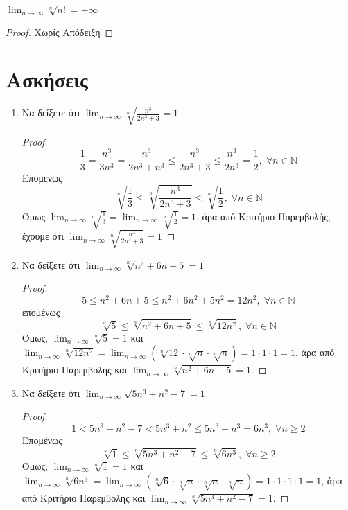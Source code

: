 \begin{mybox3}
  \begin{prop}
    $ \lim_{n \to \infty} \sqrt[n]{n!} = +\infty $ 
  \end{prop}
\end{mybox3}
\begin{proof}
  Χωρίς Απόδειξη
\end{proof}

\section{Ασκήσεις}

\begin{enumerate}
    \item Να δείξετε ότι $ \lim_{n \to \infty} \sqrt[n]{\frac{n^{3}}{2n^{3}+3}} = 1$
      \begin{proof}
        \[
          \frac{1}{3} = \frac{n^{3}}{3n^{3}} = \frac{n^{3}}{2n^{3}+n^{3}} \leq 
          \frac{n^{3}}{2n^{3}+3} \leq \frac{n^{3}}{2n^{3}} = \frac{1}{2}, \; \forall n
          \in \mathbb{N}
        \] 
        Επομένως
        \[
          \sqrt[n]{\frac{1}{3}} \leq \sqrt[n]{\frac{n^{3}}{2n^{3}+3}} \leq
          \sqrt[n]{\frac{1}{2}}, \; \forall n \in \mathbb{N} 
        \] 
        Όμως $ \lim_{n \to \infty} \sqrt[n]{\frac{1}{3}} = \lim_{n \to \infty}
        \sqrt[n]{\frac{1}{2}} = 1 $, άρα από Κριτήριο Παρεμβολής, έχουμε ότι 
        $ \lim_{n \to \infty} \sqrt[n]{\frac{n^{3}}{2n^{3}+3}} = 1 $
      \end{proof}

    \item Να δείξετε ότι $ \lim_{n \to \infty} \sqrt[n]{n^{2}+6n+5} = 1 $
      \begin{proof}
        \[
          5 \leq n^{2}+6n+5 \leq n^{2}+6n^{2}+5n^{2}=12 n^{2}, \; \forall n \in
          \mathbb{N} 
         \] 
         επομένως
         \[
           \sqrt[n]{5} \leq \sqrt[n]{n^{2}+6n+5} \leq \sqrt[n]{12n^{2}} , \; \forall n
           \in \mathbb{N}
          \] 
          Όμως, $ \lim_{n \to \infty} \sqrt[n]{5} = 1 $ και $ \lim_{n \to \infty}
          \sqrt[n]{12n^{2}} = \lim_{n \to \infty} (\sqrt[n]{12} \cdot \sqrt[n]{n} \cdot
          \sqrt[n]{n})
          = 1 \cdot 1 \cdot 1 = 1  $, άρα από Κριτήριο Παρεμβολής και 
          $ \lim_{n \to \infty} \sqrt[n]{n^{2}+6n+5} = 1 $.
      \end{proof}

    \item Να δείξετε ότι $ \lim_{n \to \infty} \sqrt{5n^{3}+n^{2}-7} = 1 $
      \begin{proof}
        \[
          1< 5n^{3}+n^{2}-7 < 5n^{3}+n^{2} \leq 5n^{3}+n^{3} = 6n^{3}, 
          \; \forall n \geq 2
        \] 
        Επομένως
        \[
          \sqrt[n]{1} \leq \sqrt[n]{5n^{3}+n^{2}-7} \leq \sqrt[n]{6n^{3}} , \; \forall n
          \geq 2
        \]
        Όμως, $ \lim_{n \to \infty} \sqrt[n]{1} = 1 $ και $ \lim_{n \to \infty}
        \sqrt[n]{6n^{3}} = \lim_{n \to \infty} (\sqrt[n]{6} \cdot \sqrt[n]{n} \cdot
        \sqrt[n]{n} \cdot \sqrt[n]{n}) = 1 \cdot 1 \cdot 1 \cdot 1 = 1  $, 
        άρα από Κριτήριο Παρεμβολής και 
        $ \lim_{n \to \infty} \sqrt[n]{5n^{3}+n^{2}-7} = 1 $.
      \end{proof}


\end{enumerate}
